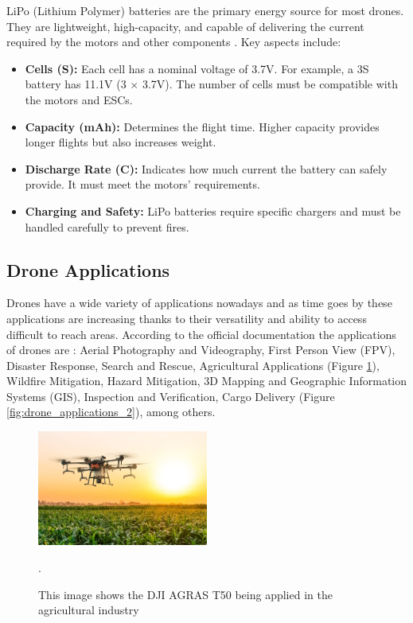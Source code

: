 LiPo (Lithium Polymer) batteries are the primary energy source for most drones. They are lightweight, high-capacity, and capable of delivering the current required by the motors and other components \cite{lipo_batteries}. Key aspects include:

\begin{itemize}
    \item \textbf{Cells (S):} Each cell has a nominal voltage of 3.7V. For example, a 3S battery has 11.1V (3 × 3.7V). The number of cells must be compatible with the motors and ESCs.
    \item \textbf{Capacity (mAh):} Determines the flight time. Higher capacity provides longer flights but also increases weight.
    \item \textbf{Discharge Rate (C):} Indicates how much current the battery can safely provide. It must meet the motors' requirements.
    \item \textbf{Charging and Safety:} LiPo batteries require specific chargers and must be handled carefully to prevent fires.
\end{itemize}

\subsection{Drone Applications}
Drones have a wide variety of applications nowadays and as time goes by these applications are increasing thanks to their versatility and ability to access difficult to reach areas. According to the official documentation \cite{ardupilot} the applications of drones are : Aerial Photography and Videography, First Person View (FPV), Disaster Response, Search and Rescue, Agricultural Applications (Figure \ref{fig:drone_applications}), Wildfire Mitigation, Hazard Mitigation, 3D Mapping and Geographic Information Systems (GIS), Inspection and Verification, Cargo Delivery (Figure \ref{fig:drone_applications_2}), among others.

\begin{figure}[H]
    \centering
    \includegraphics[width=0.5\textwidth]{pictures/drone_aplication_1.jpg}
    \caption{This image shows the DJI AGRAS T50 being applied in the agricultural industry \cite{aplications_drones} }.
    \label{fig:drone_applications}
\end{figure}

